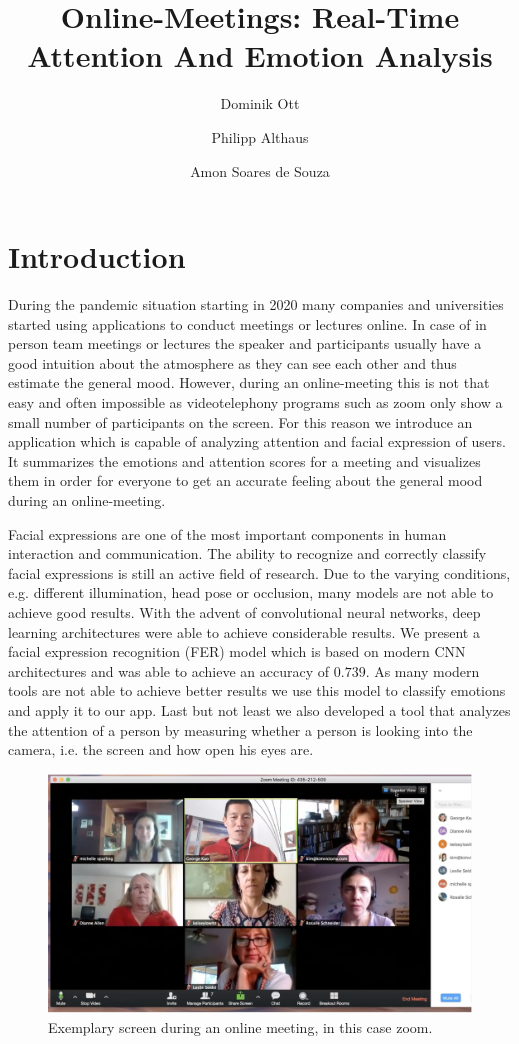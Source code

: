 \documentclass{article}
\title{Online-Meetings: Real-Time Attention And Emotion Analysis}
\author{
Dominik Ott\and Philipp Althaus
 \and
Amon Soares de Souza
}
\begin{document}

\maketitle

\section{Introduction}
During the pandemic situation starting in 2020 many companies and universities started using applications to conduct meetings or lectures online. In case of in person team meetings or lectures the speaker and participants usually have a good intuition about the atmosphere as they can see each other and thus estimate the general mood. However, during an online-meeting this is not that easy and often impossible as videotelephony programs such as zoom only show a small number of participants on the screen. For this reason we introduce an application which is capable of analyzing attention and facial expression of users. It summarizes the emotions and attention scores for a meeting and visualizes them in order for everyone to get an accurate feeling about the general mood during an online-meeting.

Facial expressions are one of the most important components in human interaction and communication. The ability to recognize and correctly classify facial expressions is still an active field of research. Due to the varying conditions, e.g. different illumination, head pose or occlusion, many models are not able to achieve good results. With the advent of convolutional neural networks, deep learning architectures were able to achieve considerable results. We present a facial expression recognition (FER) model which is based on modern CNN architectures and was able to achieve an accuracy of $0.739$. As many modern tools are not able to achieve better results we use this model to classify emotions and apply it to our app. Last but not least we also developed a tool that analyzes the attention of a person by measuring whether a person is looking into the camera, i.e. the screen and how open his eyes are.

\begin{figure}
  \centering
  \includegraphics[width=.3\textwidth]{"zoom"}
  \caption{Exemplary screen during an online meeting, in this case zoom.}
  \label{fig:zoom}
\end{figure}
\end{document}
